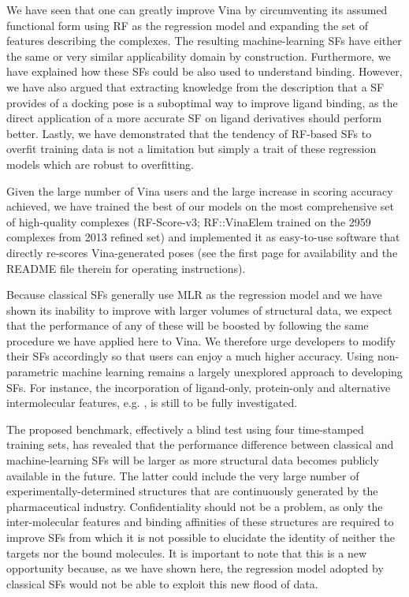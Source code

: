 We have seen that one can greatly improve Vina by circumventing its assumed functional form using RF as the regression model and expanding the set of features describing the complexes. The resulting machine-learning SFs have either the same or very similar applicability domain by construction. Furthermore, we have explained how these SFs could be also used to understand binding. However, we have also argued that extracting knowledge from the description that a SF provides of a docking pose is a suboptimal way to improve ligand binding, as the direct application of a more accurate SF on ligand derivatives should perform better. Lastly, we have demonstrated that the tendency of RF-based SFs to overfit training data is not a limitation but simply a trait of these regression models which are robust to overfitting.

Given the large number of Vina users and the large increase in scoring accuracy achieved, we have trained the best of our models on the most comprehensive set of high-quality complexes (RF-Score-v3; RF::VinaElem trained on the 2959 complexes from 2013 refined set) and implemented it as easy-to-use software that directly re-scores Vina-generated poses (see the first page for availability and the README file therein for operating instructions).

Because classical SFs generally use MLR as the regression model and we have shown its inability to improve with larger volumes of structural data, we expect that the performance of any of these will be boosted by following the same procedure we have applied here to Vina. We therefore urge developers to modify their SFs accordingly so that users can enjoy a much higher accuracy. Using non-parametric machine learning remains a largely unexplored approach to developing SFs. For instance, the incorporation of ligand-only, protein-only and alternative intermolecular features, e.g. \citep{1303}, is still to be fully investigated. 

The proposed benchmark, effectively a blind test using four time-stamped training sets, has revealed that the performance difference between classical and machine-learning SFs will be larger as more structural data becomes publicly available in the future. The latter could include the very large number of experimentally-determined structures that are continuously generated by the pharmaceutical industry. Confidentiality should not be a problem, as only the inter-molecular features and binding affinities of these structures are required to improve SFs from which it is not possible to elucidate the identity of neither the targets nor the bound molecules. It is important to note that this is a new opportunity because, as we have shown here, the regression model adopted by classical SFs would not be able to exploit this new flood of data. 

